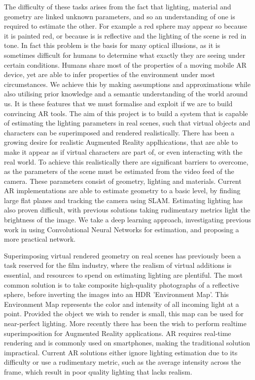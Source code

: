 \documentclass[ %
                    author={Gavin Parker},
                supervisor={Dr. Neill Campbell},
                    degree={MEng},
                     title={Deep Siamese Networks for Illumination Estimation from Stereo Images},
                  subtitle={},
                      type={research},
                      year={2018} ]{dissertation}
\begin{document}
\newline
The difficulty of these tasks arises from the fact that lighting, material and geometry are linked unknown parameters, and so an understanding of one is required to estimate the other. For example a red sphere may appear so because it is painted red, or because is is reflective and the lighting of the scene is red in tone. In fact this problem is the basis for many optical illusions, as it is sometimes difficult for humans to determine what exactly they are seeing under certain conditions. Humans share most of the properties of a moving mobile AR device, yet are able to infer properties of the environment under most circumstances. We achieve this by making assumptions and approximations while also utilising prior knowledge and a semantic understanding of the world around us. It is these features that we must formalise and exploit if we are to build convincing AR tools.
\newline
The aim of this project is to build a system that is capable of estimating the lighting parameters in real scenes, such that virtual objects and characters can be superimposed and rendered realistically. There has been a growing desire for realistic Augmented Reality applhications, that are able to make it appear as if virtual characters are part of, or even interacting with the real world. To achieve this realistically there are significant barriers to overcome, as the parameters of the scene must be estimated from the video feed of the camera. These parameters consist of geometry, lighting and materials. Current AR implementations are able to estimate geometry to a basic level, by finding large flat planes and tracking the camera using SLAM. Estimating lighting has also proven difficult, with previous solutions taking rudimentary metrics light the brightness of the image. We take a deep learning approach, investigating previous work in using Convolutional Neural Networks for estimation, and proposing a more practical network.

Superimposing virtual rendered geometry on real scenes has previously been a task reserved for the film industry, where the realism of virtual additions is essential, and resources to spend on estimating lighting are plentiful. The most common solution is to take composite high-quality photographs of a reflective sphere, before inverting the images into an HDR 'Environment Map'. This Environment Map represents the color and intensity of all incoming light at a point. Provided the object we wish to render is small, this map can be used for near-perfect lighting. More recently there has been the wish to perform realtime superimposition for Augmented Reality applications. AR requires real-time rendering and is commonly used on smartphones, making the traditional solution impractical. Current AR solutions either ignore lighting estimation due to its difficulty or use a rudimentary metric, such as the average intensity across the frame, which result in poor quality lighting that lacks realism. 
\end{document}
